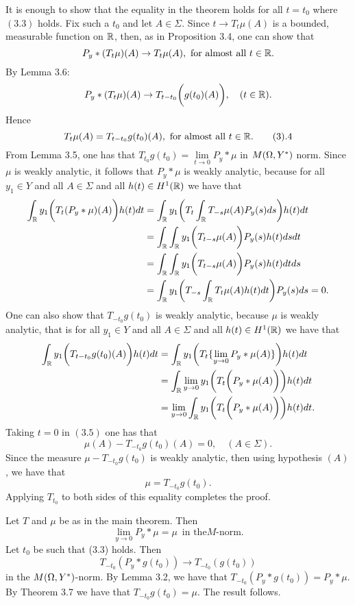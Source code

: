 \prf It is enough to show that the equality in the theorem
holds for all $t=t_0$ where $(3.3)$ holds. Fix such a $t_0$ and
let $A\in\Sigma$. Since $t\to T_t\mu(A)$ is a bounded, measurable
function on $\Bbb R$,
then, as in Proposition 3.4, one can show
that
$$ P_y\ast (T_t\mu)(A) \to T_t\mu(A),\,\, \text{for almost all }t\in
\Bbb R.$$
  By Lemma 3.6:
$$ P_y\ast (T_t \mu)(A) \to T_{t-t_0}
\biggl(g(t_0)(A)\biggr),\quad  (t\in \Bbb R).$$
Hence
$$ T_t \mu(A) = T_{t-t_0} g(t_0)(A),\,\,\text{for almost all }
t\in\R.\tag3.4$$
 From Lemma 3.5, one has that $T_{t_0} g(t_0) = \lim\limits_{t\to 0}
P_y\ast\mu$ in $M(\Omega, Y^*)$ norm.  Since $\mu$ is weakly analytic, it
follows that
$P_y\ast\mu$ is weakly analytic, because for all $y_1 \in Y$ and all
$A\in\Sigma$ and all $h(t)\in H^1 (\Bbb R)$ we have that
$$\split \int_{\R} y_1\biggl(T_t(P_y\ast\mu)(A)\biggr) h(t) dt
& =\int_{\R}y_1\biggl( T_t \int_{\R} T_{-s} \mu(A) P_y(s) ds
\biggr) h(t)dt \\
&=\int_{\R} \int_{\R} y_1\biggl(T_{t-s} \mu (A)\biggr) P_y(s)
h(t)ds dt\\
&=\int_{\R} \int_{\R} y_1\biggl(T_{t-s} \mu (A)\biggr) P_y(s)
h(t)dt ds\\
&=\int_{\R}  y_1\biggl(T_{-s}\int_{\R} T_t\mu (A) h(t) dt \biggr) P_y(s)
 ds =0.\endsplit $$
One can also show that $T_{-t_0} g(t_0)$ is weakly analytic,
because $\mu$ is weakly analytic, that is for all $y_1 \in Y$ and all
$A\in\Sigma$ and all $h(t)\in H^1(\Bbb R)$ we have that
$$\split \int_{\R} y_1\biggl(T_{t-t_0} g(t_0)(A)\biggr) h(t) dt
&= \int_{\R} y_1\biggl(T_{t}\{\lim_{y\to 0} P_y \ast
\mu(A)\}\biggr) h(t) dt\\
&=\int_{\R} \lim_{y\to 0} y_1\biggl( T_t \biggl(P_y\ast
\mu(A)\biggr)\biggr) h(t) dt\\
&=\lim_{y\to 0} \int_{\R} y_1\biggl( T_t \biggl(P_y\ast
\mu(A)\biggr)\biggr) h(t) dt.\endsplit$$
   Taking $t=0$ in $(3.5)$ one has that
$$ \mu(A) - T_{-t_0} g(t_0) (A) =0,\quad (A\in\Sigma).$$
 Since the measure  $\mu - T_{-t_0} g(t_0)$ is weakly analytic,
then using hypothesis $(A)$, we have that
$$       \mu = T_{-t_0} g(t_0). $$
Applying $T_{t_0}$ to both sides of this equality completes the
proof.\endprf

    Let $T$ and $\mu$ be as in the  main
theorem. Then
$$ \lim_{y\to 0} P_y \ast \mu =\mu\,\text{ in the
$M$-norm}.$$\endproclaim
\prf
Let $t_0$ be such that (3.3) holds.  Then
$$T_{-t_0} (P_y\ast g(t_0))\to T_{-t_0}(g(t_0))$$
in the $M(\Omega, Y^*)$-norm.
By Lemma 3.2, we have that $ T_{-t_0} ( P_y \ast g(t_0)) = P_y\ast \mu$.
By Theorem 3.7 we have that $ T_{-t_0} g(t_0) =\mu$. The result
follows.\endprf

